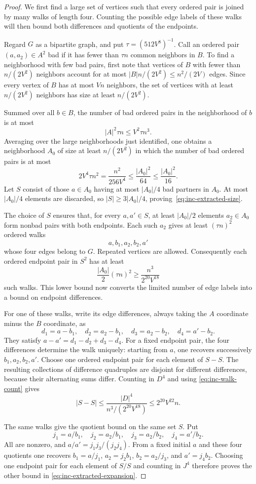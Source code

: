 \begin{proof}
We first find a large set of vertices such that every ordered pair
is joined by many walks of length four. Counting the possible edge
labels of these walks will then bound both differences and quotients
of the endpoints.

Regard $G$ as a bipartite graph, and put
$\tau=(512V^8)^{-1}$. Call an ordered pair $(a,a_2)\in A^2$ bad if
it has fewer than $\tau n$ common neighbors in $B$. To find a
neighborhood with few bad pairs, first note that vertices of $B$
with fewer than $n/(2V^2)$ neighbors account for at most
$|B|n/(2V^2)\le n^2/(2V)$ edges. Since every vertex of $B$ has at
most $Vn$ neighbors, the set of vertices with at least $n/(2V^2)$
neighbors has size at least $n/(2V^2)$.

Summed over all $b\in B$, the number of bad ordered pairs in the
neighborhood of $b$ is at most
\[
 |A|^2\tau n\le V^2\tau n^3.
\]
Averaging over the large neighborhoods just identified, one obtains
a neighborhood $A_0$ of size at least $n/(2V^2)$ in which the number
of bad ordered pairs is at most
\[
 2V^4\tau n^2=\frac{n^2}{256V^4}
 \le \frac{|A_0|^2}{64}
 \le \frac{|A_0|^2}{16}.
\]
Let $S$ consist of those $a\in A_0$ having at most $|A_0|/4$ bad
partners in $A_0$. At most $|A_0|/4$ elements are discarded, so
$|S|\ge3|A_0|/4$, proving~\eqref{eq:inc-extracted-size}.

The choice of $S$ ensures that, for every $a,a'\in S$, at least
$|A_0|/2$ elements $a_2\in A_0$ form nonbad pairs with both endpoints.
Each such $a_2$ gives at least $(\tau n)^2$
ordered walks
\[
 a,b_1,a_2,b_2,a'
\]
whose four edges belong to $G$. Repeated vertices are allowed.
Consequently each ordered endpoint pair in $S^2$ has at least
\begin{equation}\label{eq:inc-walk-count}
 \frac{|A_0|}{2}(\tau n)^2
 \ge\frac{n^3}{2^{20}V^{18}}
\end{equation}
such walks. This lower bound now converts the limited number of edge
labels into a bound on endpoint differences.

For one of these walks, write its edge differences, always taking
the $A$ coordinate minus the $B$ coordinate, as
\[
 d_1=a-b_1,\quad d_2=a_2-b_1,\quad
 d_3=a_2-b_2,\quad d_4=a'-b_2.
\]
They satisfy $a-a'=d_1-d_2+d_3-d_4$. For a fixed endpoint pair,
the four differences determine the walk uniquely: starting from $a$,
one recovers successively $b_1,a_2,b_2,a'$. Choose one ordered
endpoint pair for each element of $S-S$. The resulting collections
of difference quadruples are disjoint for different differences,
because their alternating sums differ. Counting in $D^4$ and using
\eqref{eq:inc-walk-count} gives
\[
 |S-S|\le
 \frac{|D|^4}{n^3/(2^{20}V^{18})}
 \le 2^{20}V^{22}n.
\]

The same walks give the quotient bound on the same set $S$. Put
\[
 j_1=a/b_1,\quad j_2=a_2/b_1,\quad
 j_3=a_2/b_2,\quad j_4=a'/b_2.
\]
All are nonzero, and $a/a'=j_1j_3/(j_2j_4)$. From a fixed initial
$a$ and these four quotients one recovers
$b_1=a/j_1$, $a_2=j_2b_1$, $b_2=a_2/j_3$, and $a'=j_4b_2$.
Choosing one endpoint pair for each element of $S/S$ and counting
in $J^4$ therefore proves the other bound in
\eqref{eq:inc-extracted-expansion}.
\end{proof}

